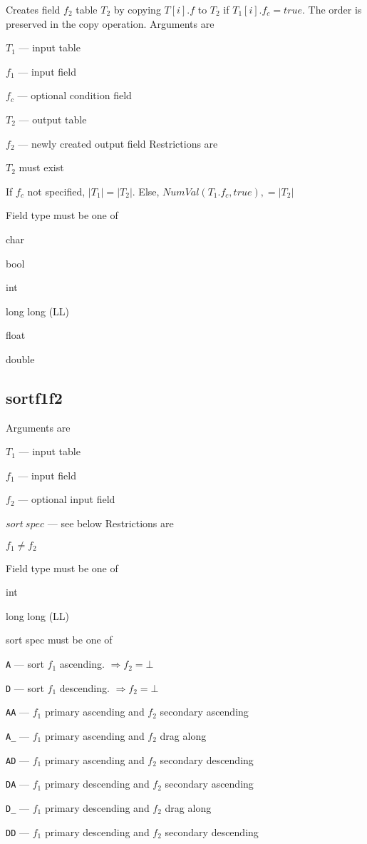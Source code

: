 Creates field \(f_2\) table \(T_2\) by copying
\(T[i].f\) to \(T_2\) if \(T_1[i].f_c = true\). The order is preserved
in the copy operation.
Arguments are
\be
\item \(T_1\) --- input table 
\item \(f_1\) --- input field 
\item \(f_c\) --- optional condition field 
\item \(T_2\) --- output table 
\item \(f_2\) --- newly created output field 
\ee
Restrictions are
\be
\item \(T_2\) must exist
\item If \(f_c\) not specified, \(|T_1| = |T_2|\). Else,
  \(NumVal(T_1.f_c, true), = |T_2|\)
\item Field type must be one of 
\be
\item char
\item bool
\item int
\item long long (LL)
\item float
\item double
\ee
\ee

\subsection{sortf1f2}
\label{sortf1f2}

Arguments are
\be
\item \(T_1\) --- input table 
\item \(f_1\) --- input field 
\item \(f_2\) --- optional input field 
\item \(sort~spec\) --- see below
\ee
Restrictions are
\be
\item \(f_1 \neq f_2\)
\item Field type must be one of 
\be
\item int
\item long long (LL)
\ee
\item sort spec must be one of 
\be
\item \verb+A+  --- sort \(f_1\) ascending. \( \Rightarrow f_2 = \bot\)
\item \verb+D+  --- sort \(f_1\) descending. \( \Rightarrow f_2 = \bot\)
\item \verb+AA+ --- \(f_1\) primary ascending and \(f_2\) secondary ascending
\item \verb+A_+ --- \(f_1\) primary ascending and \(f_2\) drag along
\item \verb+AD+ --- \(f_1\) primary ascending and \(f_2\) secondary descending
\item \verb+DA+ --- \(f_1\) primary descending and \(f_2\) secondary ascending
\item \verb+D_+ --- \(f_1\) primary descending and \(f_2\) drag along
\item \verb+DD+ --- \(f_1\) primary descending and \(f_2\) secondary descending
\ee
\ee

